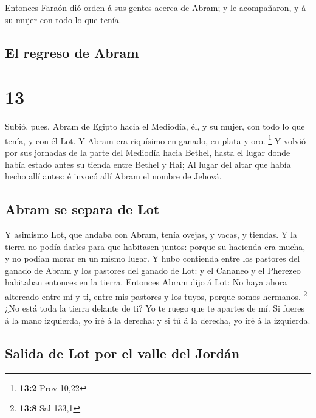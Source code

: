  Entonces Faraón dió orden á sus gentes acerca de Abram;
y le acompañaron, y á su mujer con todo lo que tenía.

\hypertarget{el-regreso-de-abram}{%
\subsection{El regreso de Abram}\label{el-regreso-de-abram}}

\hypertarget{section-12}{%
\section{13}\label{section-12}}

 Subió, pues, Abram de Egipto hacia el Mediodía, él, y su
mujer, con todo lo que tenía, y con él Lot.  Y Abram era
riquísimo en ganado, en plata y oro. \footnote{\textbf{13:2} Prov 10,22}
 Y volvió por sus jornadas de la parte del Mediodía hacia
Bethel, hasta el lugar donde había estado antes su tienda entre Bethel y
Hai;  Al lugar del altar que había hecho allí antes: é
invocó allí Abram el nombre de Jehová.

\hypertarget{abram-se-separa-de-lot}{%
\subsection{Abram se separa de Lot}\label{abram-se-separa-de-lot}}

 Y asimismo Lot, que andaba con Abram, tenía ovejas, y
vacas, y tiendas.  Y la tierra no podía darles para que
habitasen juntos: porque su hacienda era mucha, y no podían morar en un
mismo lugar.  Y hubo contienda entre los pastores del
ganado de Abram y los pastores del ganado de Lot: y el Cananeo y el
Pherezeo habitaban entonces en la tierra.  Entonces Abram
dijo á Lot: No haya ahora altercado entre mí y ti, entre mis pastores y
los tuyos, porque somos hermanos. \footnote{\textbf{13:8} Sal 133,1}
 ¿No está toda la tierra delante de ti? Yo te ruego que te
apartes de mí. Si fueres á la mano izquierda, yo iré á la derecha: y si
tú á la derecha, yo iré á la izquierda.

\hypertarget{salida-de-lot-por-el-valle-del-jorduxe1n}{%
\subsection{Salida de Lot por el valle del
Jordán}\label{salida-de-lot-por-el-valle-del-jorduxe1n}}

